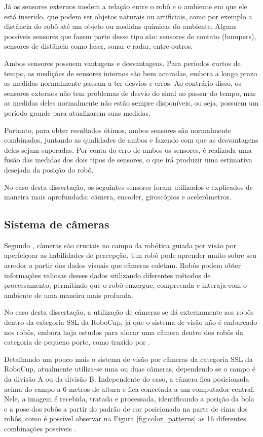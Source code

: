 \documentclass[acronym, symbols, table, deposito]{fei}
\begin{document}
			Já os sensores externos medem a relação entre o robô e o ambiente em que ele está inserido, que podem ser objetos naturais ou artificiais, como por exemplo a distância do robô até um objeto ou medidas químicas do ambiente. Alguns possíveis sensores que fazem parte desse tipo são: sensores de contato (bumpers), sensores de distância como laser, sonar e radar, entre outros.
			
			Ambos sensores possuem vantagens e desvantagens. Para períodos curtos de tempo, as medições de sensores internos são bem acuradas, embora a longo prazo as medidas normalmente passam a ter desvios e erros. Ao contrário disso, os sensores externos não tem problemas de desvio do sinal ao passar do tempo, mas as medidas deles normalmente não estão sempre disponíveis, ou seja, possuem um período grande para atualizarem suas medidas.
			
			Portanto, para obter resultados ótimos, ambos sensores são normalmente combinados, juntando as qualidades de ambos e fazendo com que as desvantagens deles sejam superadas. Por conta do erro de ambos os sensores, é realizada uma fusão das medidas dos dois tipos de sensores, o que irá produzir uma estimativa desejada da posição do robô.
			
			No caso desta dissertação, os seguintes sensores foram utilizados e explicados de maneira mais aprofundada: câmera, encoder, giroscópios e acelerômetros.
			
			\subsection{Sistema de câmeras} \label{sec:sensores_cameras}
				
				Segundo \textcite{cameras_technexion}, câmeras são cruciais no campo da robótica guiada por visão por aperfeiçoar as habilidades de percepção. Um robô pode aprender muito sobre seu arredor a partir dos dados visuais que câmeras coletam. Robôs podem obter informações valiosas desses dados utilizando diferentes métodos de processamento, permitindo que o robô enxergue, compreenda e interaja com o ambiente de uma maneira mais profunda.
				
				No caso desta dissertação, a utilização de câmeras se dá externamente aos robôs dentro da categoria SSL da RoboCup, já que o sistema de visão não é embarcado nos robôs, embora haja estudos para alocar uma câmera dentro dos robôs da categoria de pequeno porte, como trazido por \textcite{melo2022embedded}.
				
				Detalhando um pouco mais o sistema de visão por câmeras da categoria SSL da RoboCup, atualmente utiliza-se uma ou duas câmeras, dependendo se o campo é da divisão A ou da divisão B. Independente do caso, a câmera fica posicionada acima do campo a 6 metros de altura e fica conectada a um computador central. Nele, a imagem é recebida, tratada e processada, identificando a posição da bola e a pose dos robôs a partir do padrão de cor posicionado na parte de cima dos robôs, como é possível observar na Figura \ref{fig:color_patterns} as 16 diferentes combinações possíveis \cite{10.1007/978-3-642-11876-0_37}.
				
\end{document}

